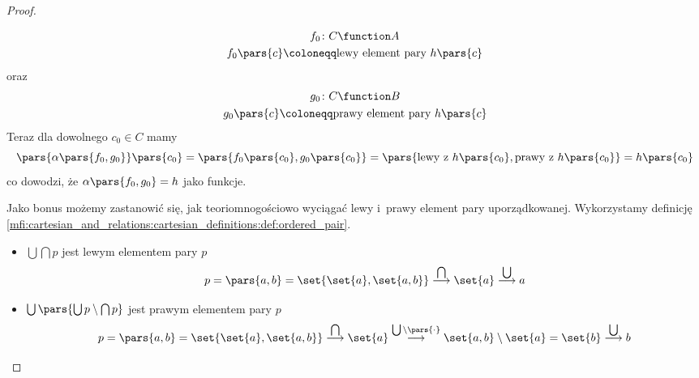 \begin{proof}
\begin{description}
\begin{gather*}
            f_0\colon C \function A\\
            f_0\pars{c} \coloneqq \text{lewy element pary \(h\pars{c}\)}
        \end{gather*}
        oraz
        \begin{gather*}
            g_0\colon C \function B\\
            g_0\pars{c} \coloneqq \text{prawy element pary \(h\pars{c}\)}
        \end{gather*}
        Teraz dla dowolnego \(c_0 \in C\) mamy
        \begin{equation*}
            \pars{\alpha\pars{f_0, g_0}}\pars{c_0}
                = \pars{f_0\pars{c_0}, g_0\pars{c_0}}
                = \pars{\text{lewy z~\(h\pars{c_0}\)}, \text{prawy z~\(h\pars{c_0}\)}}
                = h\pars{c_0}
        \end{equation*}
        co dowodzi, że \(\alpha\pars{f_0, g_0} = h\) jako funkcje.
        
        Jako bonus możemy zastanowić się, jak teoriomnogościowo wyciągać lewy i~prawy element pary uporządkowanej. Wykorzystamy definicję \ref{mfi:cartesian_and_relations:cartesian_definitions:def:ordered_pair}.
        \begin{itemize}
            \item \(\bigcup\bigcap p\) jest lewym elementem pary \(p\)
                \begin{equation*}
                    p = \pars{a, b} = \set{\set{a}, \set{a, b}} \overset{\bigcap}{\longrightarrow} \set{a} \overset{\bigcup}{\longrightarrow} a
                \end{equation*}
            \item \(\bigcup\pars{\bigcup p \setminus \bigcap p}\) jest prawym elementem pary \(p\)
                \begin{equation*}
                    p = \pars{a, b} = \set{\set{a}, \set{a, b}} \overset{\bigcap}{\longrightarrow} \set{a} \overset{\bigcup \setminus \pars{\mathord{\cdot}}}{\longrightarrow} \set{a, b} \setminus \set{a} = \set{b} \overset{\bigcup}{\longrightarrow} b
                \end{equation*}
        \end{itemize}
\end{description}
\end{proof}
